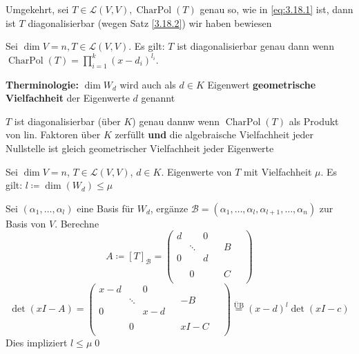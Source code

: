 Umgekehrt, sei $ T \in \mathcal{L} \left( V, V \right) , \operatorname{Char Pol}(T) $ genau so, wie in \eqref{eq:3.18.1} ist, dann ist $ T $ diagonalisierbar (wegen Satz \ref{3.18.2}) wir haben bewiesen

\begin{subtheorem}
	Sei $ \dim V = n, T \in \mathcal{L} \left( V, V \right)  $.
	Es gilt: $ T $ ist diagonalisierbar genau dann wenn $ \operatorname{Char Pol}(T) = \prod_{i = 1}^{k} (x - d_i)^{l_i}   $.

	\textbf{Therminologie:} $ \dim W_d $ wird auch als $ d \in K $ Eigenwert \textbf{geometrische Vielfachheit} der Eigenwerte $ d $ genannt

	$ T $ ist diagonalisierbar (über $ K $) genau dannw wenn $ \operatorname{Char Pol}(T) $ als Produkt von lin. Faktoren über $ K $ zerfüllt \textbf{und} die algebraische Vielfachheit jeder Nullstelle ist gleich geometrischer Vielfachheit jeder Eigenwerte
\end{subtheorem}

\begin{subtheorem}
	Sei $ \dim V = n $, $ T \in \mathcal{L} \left( V, V \right)  $, $ d \in K $. Eigenwerte von $ T $ mit Vielfachheit $ \mu $.
	Es gilt: $ l \coloneqq \dim \left( W_d \right) \leq \mu $
\end{subtheorem}
\begin{subproof*}
	Sei $ \left( \alpha_1, \dotsc, \alpha_l \right)  $ eine Basis für $ W_d $, ergänze $ \mathcal{B} = \left( \alpha_1, \dotsc, \alpha_l, \alpha_{l + 1} , \dotsc, \alpha_n \right)  $ zur Basis von $ V $. Berechne
	\[
		A \coloneqq [T]_{\mathcal{B} }
		= \begin{pmatrix} d & & 0 \\ & \ddots & & & B & ~ \\ 0 & & d \\ \\ & 0 & & & C \\ ~  \end{pmatrix} 
	\]
	\[
		\det(xI - A)
		= \begin{pmatrix} x - d & & 0 \\ & \ddots & & & -B & ~ \\ 0 & & x - d \\ \\ & 0 & & & xI -C \\ ~  \end{pmatrix} 
		\overset{\text{ÜB} }{=} (x - d)^{l} \det (xI - c)
	\]
	Dies impliziert $ l \leq \mu $\qed
\end{subproof*}

